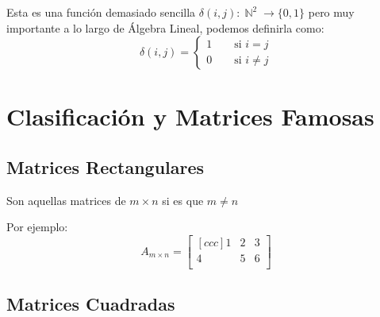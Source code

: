 \documentclass[12pt, fleqn]{report}                             %
\DeclareMathOperator \Space {\quad}                             %
\DeclareMathOperator \Naturals  {\mathbb{N}}                     %
\begin{document}
            Esta es una función demasiado sencilla $\delta(i,j): \Naturals^2 \to \{0,1\}$
            pero muy importante a lo largo de Álgebra Lineal, podemos definirla como:
            \begin{equation}
                \delta(i,j) =
                \begin{cases}
                    1 \Space \text{ si } i = j \\
                    0 \Space \text{ si } i \neq j
                \end{cases}
            \end{equation}



        \clearpage
        \section{Clasificación y Matrices Famosas}

            \subsection{Matrices Rectangulares}

                Son aquellas matrices de $m \times n$ si es que $m \neq n$ 

                Por ejemplo: 
                \begin{equation*}
                    A_{m \times n} =
                    \begin{bmatrix}[ccc]
                        1 & 2 & 3   \\
                        4 & 5 & 6   \\
                    \end{bmatrix}
                \end{equation*}

            \subsection{Matrices Cuadradas}
\end{document}
